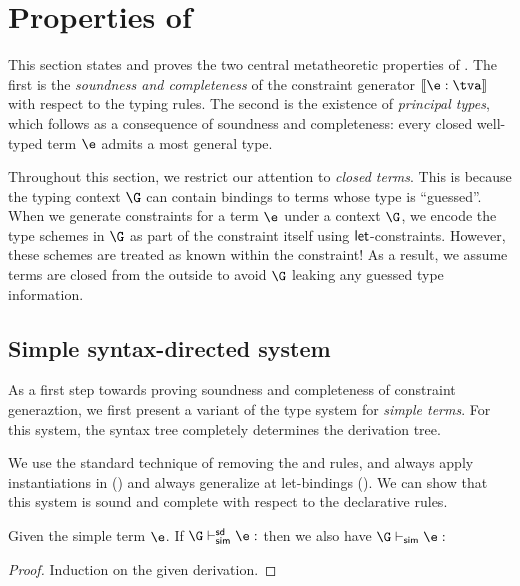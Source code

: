 \documentclass[acmsmall,screen,nonacm,review]{acmart}
\begin{document}
\clearpage
\section{Properties of \OML}
\label{app:proofs-typing}

This section states and proves the two central metatheoretic properties of \OML. The first
is the \emph{soundness and completeness} of the constraint generator $\cinfer \e \tv$ with
respect to the \OML typing rules. The second is the existence of \emph{principal types},
which follows as a consequence of soundness and completeness: every closed well-typed term $\e$
admits a most general type.

Throughout this section, we restrict our attention to \emph{closed terms}. This is because the
typing context $\G$ can contain bindings to terms whose type is ``guessed''. When we
generate constraints for a term $\e$ under a context $\G$, we encode the type schemes in
$\G$ as part of the constraint itself using $\mathopen{}\mathrel{\mathsf{let}}$-constraints. However, these schemes are treated as
known within the constraint! As a result, we assume terms are closed from the outside to avoid
$\G$ leaking any guessed type information.

\subsection{Simple syntax-directed system}

As a first step towards proving soundness and completeness of constraint
generaztion, we first present a variant of the \OML type system for \emph{simple terms}. For this
system, the syntax tree completely determines the derivation tree.

We use the standard technique of removing the  and  rules,
and always apply instantiations in  () and always
generalize at let-bindings (). We can show that this system is
sound and complete with respect to the declarative rules.

\begin{theorem}
  \label{thm:soundness-sd}
  Given the simple term $\e$.
  If $\G \thsimplesd \e : \t$ then we also have $\G \thsimple \e : \t$
  \begin{proof}
    Induction on the given derivation.
  \end{proof}
\end{theorem}
\end{document}
